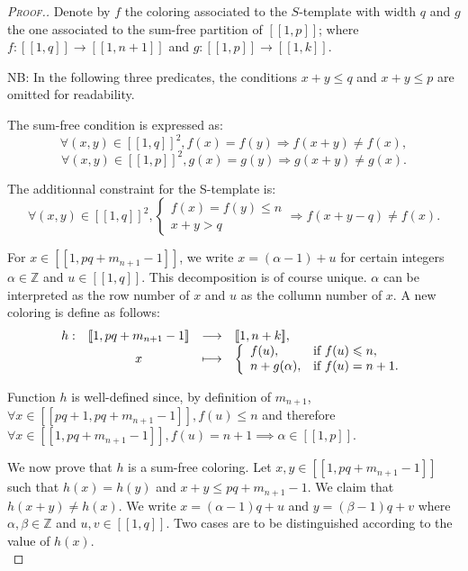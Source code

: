 \begin{proof}[\textsc{Proof.}]
	Denote by \(f\) the coloring associated to the \(S\)-template with width \(q\) and \(g\) the one associated 
	to the sum-free partition of \([\![1,p]\!]\); where \(f : [\![1,q]\!] \longrightarrow [\![1,n+1]\!]\) and 
	\(g : [\![1,p]\!] \longrightarrow [\![1,k]\!]\).
	
	\par
	NB: In the following three predicates, the conditions \(x + y \leqslant q\)  and \(x + y \leqslant p\) are omitted for readability.
	\par
	The sum-free condition is expressed as:
	\[\forall (x,y) \in [\![1,q]\!]^2, f(x) = f(y) \Longrightarrow f(x+y) \neq f(x),\]
	\[\forall (x,y) \in [\![1,p]\!]^2, g(x) = g(y) \Longrightarrow g(x+y) \neq g(x).\]
	
	The additionnal constraint for the S-template is:
	\[
	\forall (x,y) \in [\![1,q]\!]^2, \left\{
	\begin{array}{l}
		f(x) = f(y) \leqslant n \\
		x + y > q
	\end{array}
	\right. \Longrightarrow f(x+y-q) \neq f(x).
	\]
	
	For \(x \in [\![1,pq+m_{n+1}-1]\!]\), we write \(x = (\alpha - 1) + u\) for certain integers \(\alpha \in \mathbb{Z}\) and 
	\(u \in [\![1,q]\!]\). This decomposition is of course unique. \(\alpha\)  can be interpreted as the row number of \(x\) and 
	\(u\) as the collumn number of \(x\). A new coloring is define as follows:
	\[
	\begin{array}{c c c l}
		h : & [\![1,pq+m_{n+1}-1]\!] & \longrightarrow & [\![1,n+k]\!], \\
		& x & \longmapsto & 
		\left\{ \begin{array}{l l}
			f(u), & \text{if}~f(u) \leqslant n, \\
			n + g(\alpha), & \text{if}~f(u) = n + 1. \\
		\end{array} \right.
	\end{array}
	\]
	
	Function \(h\) is well-defined since, by definition of \(m_{n+1}\), \(\forall x \in [\![p q + 1, p q + m_{n + 1} - 1 ]\!], f(u) 
	\leqslant n\) and therefore \(\forall x \in [\![1,pq+m_{n+1}-1]\!], f(u) = n + 1 \implies \alpha \in [\![1, p]\!]\).
	
	\par
	We now prove that \(h\) is a sum-free coloring. Let \(x,y \in [\![1,pq + m_{n+1}-1]\!]\) such that \(h(x) = h(y)\) 
	and \(x+y \leqslant pq+m_{n+1}-1\). We claim that \(h(x+y) \neq h(x)\). We write \(x = (\alpha - 1) q + u\) and 
	\(y = (\beta - 1) q + v\) where \(\alpha, \beta \in \mathbb{Z}\) and \(u, v \in [\![1,q]\!]\). Two cases are to be
	distinguished according to the value of \(h(x)\). \\
	

\end{proof}
